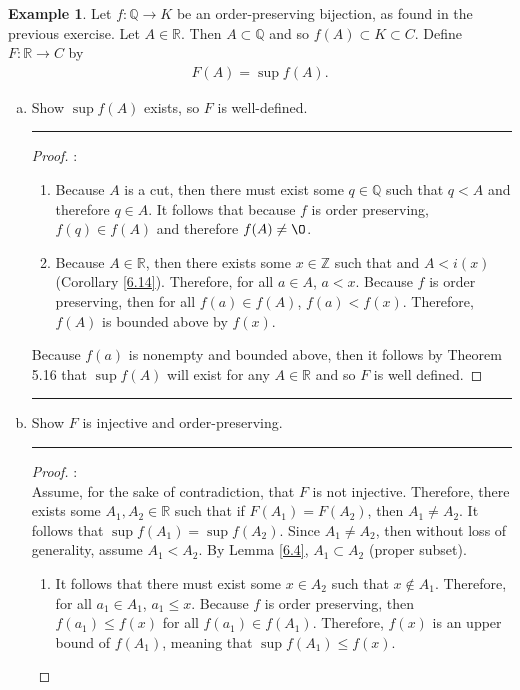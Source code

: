 \documentclass[openany, amssymb, psamsfonts]{amsart}
\newcommand{\bbQ}{\mathbb{Q}}
\newcommand{\bbR}{\mathbb{R}}
\newcommand{\bbZ}{\mathbb{Z}}
\renewcommand{\emptyset}{\O}
\newcommand{\arr}{\longrightarrow}
\theoremstyle{definition}
\newtheorem{exmp}{Example}[section]
\numberwithin{equation}{section}
\begin{document}
\begin{exmp}
    Let $f\colon \bbQ \arr K$ be an order-preserving bijection, as found in the previous exercise. Let $A \in \bbR$. Then $A \subset \bbQ$ and so $f(A) \subset K \subset C$. Define $F\colon \bbR \arr C$ by 
	\begin{align*}
		F(A) = \sup f(A).
	\end{align*}
	\begin{enumerate}[(a)]
 \label{Example 6.17.a}
		\item Show $\sup f(A)$ exists, so $F$ is well-defined.
\vspace{4pt}     \hrule   \vspace{4pt}
\begin{proof}:\\
\begin{enumerate}
\item Because $A$ is a cut, then there must exist some $q\in \bbQ$ such that $q<A$ and therefore $q\in A$. It follows that because $f$ is order preserving, $f(q) \in f(A)$ and therefore $f(A) \neq \emptyset$. 
\item Because $A\in \bbR$, then there exists some $x\in \bbZ$ such that and $A<i(x)$ (Corollary \ref{6.14}). Therefore, for all $a\in A$, $a<x$. Because $f$ is order preserving, then for all $f(a) \in f(A)$, $f(a)<f(x)$. Therefore, $f(A)$ is bounded above by $f(x)$. 
\end{enumerate}
Because $f(a)$ is nonempty and bounded above, then it follows by Theorem 5.16 that $\sup f(A)$ will exist for any $A\in \bbR$ and so $F$ is well defined.
\end{proof}\vspace{4pt}     \hrule   \vspace{4pt}
		\item Show $F$ is injective and order-preserving.
  \label{Example 6.17.b}
\vspace{4pt}     \hrule   \vspace{4pt}
\begin{proof}:\\
Assume, for the sake of contradiction, that $F$ is not injective. Therefore, there exists some $A_1,A_2 \in \bbR$ such that if $F(A_1)=F(A_2)$, then $A_1 \neq A_2$. It follows that $\sup f(A_1) = \sup f(A_2)$. Since $A_1 \neq A_2$, then without loss of generality, assume $A_1<A_2$. By Lemma \ref{6.4}, $A_1 \subset A_2$ (proper subset). 
\begin{enumerate}
\item It follows that there must exist some $x\in A_2$ such that $x\notin A_1$. Therefore, for all $a_1\in A_1$, $a_1 \leq x$. Because $f$ is order preserving, then $f(a_1)\leq f(x)$ for all $f(a_1) \in f(A_1)$. Therefore, $f(x)$ is an upper bound of $f(A_1)$, meaning that $\sup f(A_1) \leq f(x)$. 

\end{enumerate}
\end{proof}
\end{enumerate}
\end{exmp}
\end{document}
